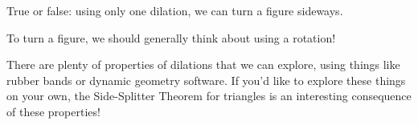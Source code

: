 \documentclass{ximera}
\begin{document}
\begin{question}
True or false: using only one dilation, we can turn a figure sideways.
\begin{multipleChoice}
\end{multipleChoice}
\begin{feedback}
To turn a figure, we should generally think about using a rotation!
\end{feedback}
\end{question}

There are plenty of properties of dilations that we can explore, using things like rubber bands or dynamic geometry software. If you'd like to explore these things on your own, the Side-Splitter Theorem for triangles is an interesting consequence of these properties!
\end{document}
